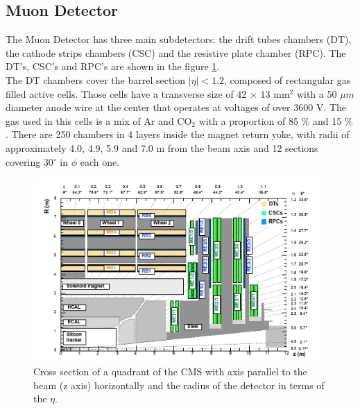 \subsection{Muon Detector}
The Muon Detector has three main subdetectors: the drift tubes chambers (DT), the cathode strips chambers (CSC) and the resistive plate chamber (RPC). 
The DT's, CSC's and RPC's are shown in the figure \ref{dt}.
 \\
 
The DT chambers cover the barrel section $|\eta|<1.2$, composed of rectangular gas filled active cells. Those cells have a transverse size of 42 $\times$ 13 mm$^2$ with a 50 $\mu m$ diameter anode wire at the center that operates at voltages of over 3600 V. The gas used in this cells is a mix of Ar and CO$_2$ with a proportion of 85 $\%$ and 15 $\%$. There are 250 chambers in 4 layers inside the magnet return yoke, with radii of approximately 4.0, 4.9, 5.9 and 7.0 m from the beam axis and 12 sections covering 30$^\circ$ in $\phi$ each one.
\\
\begin{figure}[!htbp]
	\centering
	\includegraphics[width=11cm,height=7cm]{Chapter2/csc}
	\caption{Cross section of a quadrant of the CMS with axis parallel to the beam (z axis) horizontally and the radius of the detector in terms of the $\eta$\cite{cms-manual}.}
	\label{dt}
\end{figure}


